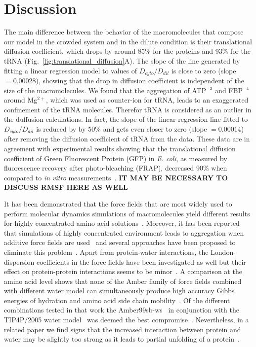 \documentclass[journal=jcisd8,manuscript=article]{achemso}
\begin{document}
 

\section*{Discussion}\label{sec:dissc}
The main difference between the behavior of the macromolecules that
compose our model in the crowded system and in the dilute condition is
their translational diffusion coefficient, which drops by around
85\% for the proteins and 93\% for the tRNA
(Fig.~\ref{fig:translational_diffusion}A). The slope of the line
generated by fitting a linear regression model to values of
$D_{cyto}/D_{dil}$ is close to zero (slope $= 0.00028$), showing that
the drop in diffusion coefficient is independent of the size of the
macromolecules. We found that the aggregation of ATP$^{-3}$ and
FBP$^{-4}$ around Mg$^{2+}$, which was used as counter-ion for tRNA,
leads to an exaggerated confinement of the tRNA molecules.  Therefor
tRNA is considered as an outlier in the duffusion calculations. In
fact, the slope of the linear regression line fitted to
$D_{cyto}/D_{dil}$ is reduced by by 50\% and gets even closer to zero
(slope $= 0.00014$) after removing the diffusion coefficient of tRNA
from the data. These data are in agreement with experimental results
showing that the translational diffusion coefficient of Green
Fluorescent Protein (GFP) in {\em E. coli}, as measured by
fluorescence recovery after photo-bleaching (FRAP), decreased 90\%
when compared to {\em in vitro}
measurements~\cite{Elowitz1999,Konopka2006}.
{\bf IT MAY BE NECESSARY TO DISCUSS RMSF HERE AS WELL}

It has been demonstrated that the force fields that are most widely
used to perform molecular dynamics simulations of macromolecules yield
different results for highly concentrated amino acid
solutions~\cite{andrews2013}. Moreover, it has been reported that
simulations of highly concentrated environment leads to aggregation
when additive force fields are used~\cite{Petrov2014a,Abriata2015a,
  Nawrocki2017a} and several approaches have been proposed to
eliminate this
problem~\cite{Best2014a,Piana2015a,Bashardanesh2018b}. Apart from
protein-water interactions, the London-dispersion coefficients in the
force fields have been investigated as well but their effect on
protein-protein interactions seems to be
minor~\cite{Mohebifar2017a,Walters2018a,Bashardanesh2018b}.  A
comparison at the amino acid level shows that none of the Amber family
of force fields combined with different water model can simultaneously
produce high accuracy Gibbs energies of hydration and amino acid side
chain mobility~\cite{HZhang2018a}. Of the different combinations
tested in that work the Amber99sb-ws~\cite{Best2014a} in conjunction
with the TIP4P/2005 water model~\cite{Abascal2005b} was deemed the
best compromise~\cite{HZhang2018a}. Nevertheless, in a related paper
we find signs that the increased interaction between protein and water
may be slightly too strong as it leads to partial unfolding of a
protein~\cite{Bashardanesh2019a}.
\end{document}
